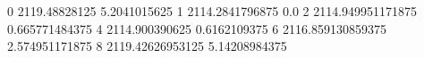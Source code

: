 0 2119.48828125 5.2041015625
1 2114.2841796875 0.0
2 2114.949951171875 0.665771484375
4 2114.900390625 0.6162109375
6 2116.859130859375 2.574951171875
8 2119.42626953125 5.14208984375
